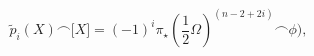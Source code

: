 \begin{equation}
\tilde{p}_{i}(X)\smallfrown \lbrack X]=(-1)^{i}\pi _{\star }(\frac{1}{2}%
\Omega )^{(n-2+2i)}\smallfrown \phi ),  \label{46}
\end{equation}

